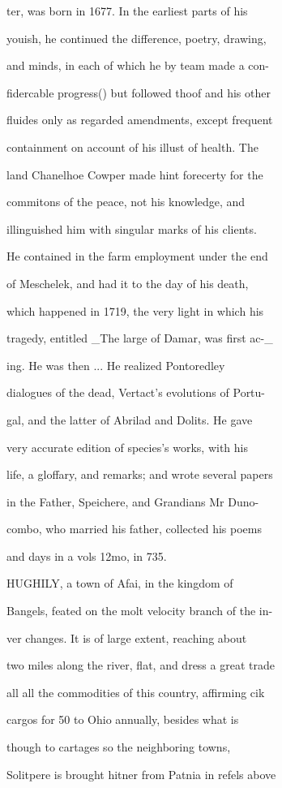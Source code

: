 \documentclass{article}
\begin{document}
ter, was born in 1677. In the earliest parts of his

youish, he continued the difference, poetry, drawing,

and minds, in each of which he by team made a con-

fidercable progress() but followed thoof and his other

fluides only as regarded amendments, except frequent

containment on account of his illust of health. The

land Chanelhoe Cowper made hint forecerty for the

commitons of the peace, not his knowledge, and

illinguished him with singular marks of his clients.

He contained in the farm employment under the end

of Meschelek, and had it to the day of his death,

which happened in 1719, the very light in which his

tragedy, entitled \_The large of Damar, was first ac-\_

ing. He was then ... He realized Pontoredley

dialogues of the dead, Vertact's evolutions of Portu-

gal, and the latter of Abrilad and Dolits. He gave

very accurate edition of species's works, with his

life, a gloffary, and remarks; and wrote several papers

in the Father, Speichere, and Grandians Mr Duno-

combo, who married his father, collected his poems

and days in a vols 12mo, in 735.

HUGHILY, a town of Afai, in the kingdom of

Bangels, feated on the molt velocity branch of the in-

ver changes. It is of large extent, reaching about

two miles along the river, flat, and dress a great trade

all all the commodities of this country, affirming cik

cargos for 50 to Ohio annually, besides what is

though to cartages so the neighboring towns,

Solitpere is brought hitner from Patnia in refels above
\end{document}
